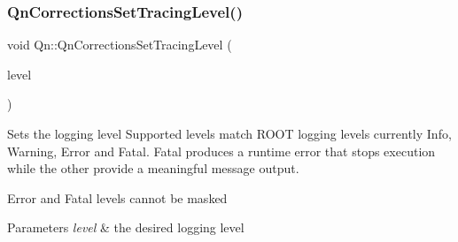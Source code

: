 \subsubsection{\texorpdfstring{Qn\+Corrections\+Set\+Tracing\+Level()}{QnCorrectionsSetTracingLevel()}}
{\footnotesize\ttfamily void Qn\+::\+Qn\+Corrections\+Set\+Tracing\+Level (\begin{DoxyParamCaption}\item[{U\+Int\+\_\+t}]{level }\end{DoxyParamCaption})}

Sets the logging level Supported levels match R\+O\+OT logging levels currently Info, Warning, Error and Fatal. Fatal produces a runtime error that stops execution while the other provide a meaningful message output.

Error and Fatal levels cannot be masked


\begin{DoxyParams}{Parameters}
{\em level} & the desired logging level \\
\hline
\end{DoxyParams}
